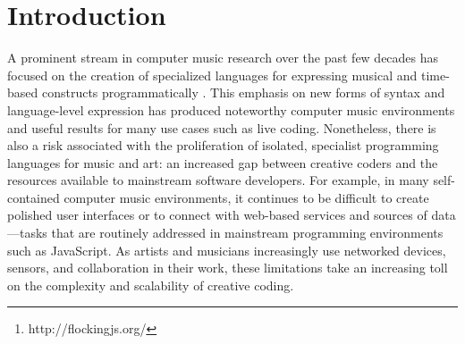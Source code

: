 \documentclass{article}
\title{\papertitle}
\begin{document}
\sloppy
%
\capstartfalse
\maketitle
\capstarttrue
%
\begin{abstract}
Flocking\footnote{http://flockingjs.org/} is a framework for audio synthesis and music composition written in JavaScript. It takes a unique approach to solving several of the common architectural problems faced by computer music environments, emphasizing a declarative style that is closely aligned with the principles of the web.

Flocking's goal is to enable the growth of an ecosystem of tools that can easily parse and understand the logic and semantics of digital instruments by representing the basic building blocks of synthesis declaratively. This is particularly useful for supporting generative composition (where programs generate new instruments and scores algorithmically), graphical tools (for programmers and non-programmers alike to collaborate), and new modes of social programming that allow musicians to easily adapt, extend, and rework existing instruments without having to ``fork" their code.

Flocking provides a robust, optimized, and well-tested architecture that explicitly supports extensibility and long-term growth. Flocking runs in nearly any modern JavaScript environment, including desktop and mobile browsers (Chrome, Firefox, and Safari), as well as on embedded devices with Node.js.

\end{abstract}

\section{Introduction}\label{sec:introduction}

A prominent stream in computer music research over the past few decades has focused on the creation of specialized languages for expressing musical and time-based constructs programmatically \cite{dannenberg2002language,wang2003chuck,mccartney1996supercollider,orlarey2009faust}. This emphasis on new forms of syntax and language-level expression has produced noteworthy computer music environments and useful results for many use cases such as live coding. Nonetheless, there is also a risk associated with the proliferation of isolated, specialist programming languages for music and art: an increased gap between creative coders and the resources available to mainstream software developers. For example, in many self-contained computer music environments, it continues to be difficult to create polished user interfaces or to connect with web-based services and sources of data---tasks that are routinely addressed in mainstream programming environments such as JavaScript. As artists and musicians increasingly use networked devices, sensors, and collaboration in their work, these limitations take an increasing toll on the complexity and scalability of creative coding.
\end{document}
